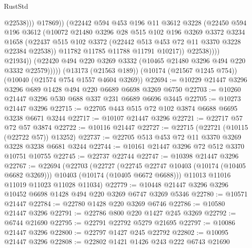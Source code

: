 \begin{lexlean}{RustStd}
\begin{coremodule}
                              @22538)))
                        @17869))
                    (@22442
                      @594
                      @453
                      @196
                      @11
                      @3612
                      @3228
                      (@22450
                        @594
                        @196
                        @3612
                        (@10072
                          @21480
                          @3296
                          @28
                          @515
                          @102
                          @196
                          @3269
                          @3372
                          @3234
                          @1658
                          (@22437
                            @515
                            @102
                            @3372
                            (@22442 @513 @453 @72 @11 @3370 @3228 @22384 @22538))
                          @11782
                          @11785
                          @11788
                          @11791
                          @10217))
                      @22538))))
              @21934))
          (@22420 @494 @220 @3269 @3332 (@10465 @21480 @3296 @494 @220 @3332 @22579)))))
    (@13173 (@21563 @189))
    (@10174 (@21567 @1245 @754))
    (@10040 (@21574 @754 @1557 @4604 @3269))
@22694 := @10229 @21447 @3296 @3296 @689 @1428 @494 @220 @6689 @6698 @3269 @6750
@22703 := @10260 @21447 @3296 @530 @688 @337 @231 @6689 @6696 @3445
@22705 := @10273 @21447 @3296
@22715 := @22705 @443 @515 @72 @102 @3874 @6688 @6695 @3238 @6671 @3244
@22717 := @10107 @21447 @3296
@22721 := @22717 @57 @72 @57 @3874
@22722 := @10116 @21447
@22727 := @22715 (@22721 (@10115 (@22722 @57)) @13252)
@22737 := @22705 @513 @453 @72 @11 @3370 @3269 @3228 @3238 @6681 @3244
@22744 := @10161 @21447 @3296 @72 @512 @3370 @10751 @10755
@22745 := @22737 @22744
@22747 := @10398 @21447 @3296
@22767 := @22694
    (@22703
      (@22727
        (@22745 @22747 @10403 (@10174 (@10405 @6682 @3269)))
        @10403
        (@10174 (@10405 @6672 @6688)))
      @11013
      @11016
      @11019
      @11023
      @11028
      @11034)
@22779 := @10448 @21447 @3296 @3296 @10452 @6698 @1428 @494 @220 @3269 @6747 @3269 @5346
@22780 := @10571 @21447
@22784 := @22780 @1428 @220 @3269 @6746
@22786 := @10580 @21447 @3296
@22791 := @22786 @800 @220 @1427 @245 @3269
@22792 := @6744 @21690
@22795 := @22791 @22792 @5279 @21695
@22797 := @10086 @21447 @3296
@22800 := @22797 @1427 @245 @22792
@22802 := @10095 @21447 @3296
@22808 := @22802 @1421 @1426 @243 @222 @6743 @21690

\end{coremodule}
\end{lexlean}
